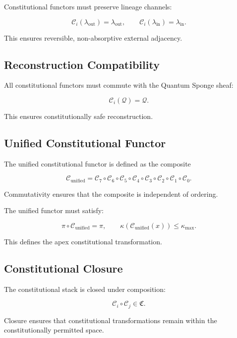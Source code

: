 Constitutional functors must preserve lineage channels:

\[
\mathcal{C}_i(\lambda_{\mathrm{out}}) = \lambda_{\mathrm{out}}, \qquad
\mathcal{C}_i(\lambda_{\mathrm{in}})  = \lambda_{\mathrm{in}}.
\]

This ensures reversible, non-absorptive external adjacency.


\subsection{Reconstruction Compatibility}

All constitutional functors must commute with the Quantum Sponge sheaf:

\[
\mathcal{C}_i(\mathcal{Q}) = \mathcal{Q}.
\]

This ensures constitutionally safe reconstruction.


\subsection{Unified Constitutional Functor}

The unified constitutional functor is defined as the composite

\[
\mathcal{C}_{\mathrm{unified}}
=
\mathcal{C}_7 \circ \mathcal{C}_6 \circ \mathcal{C}_5 \circ
\mathcal{C}_4 \circ \mathcal{C}_3 \circ \mathcal{C}_2 \circ
\mathcal{C}_1 \circ \mathcal{C}_0.
\]

Commutativity ensures that the composite is independent of ordering.

The unified functor must satisfy:

\[
\pi \circ \mathcal{C}_{\mathrm{unified}} = \pi,
\qquad
\kappa(\mathcal{C}_{\mathrm{unified}}(x)) \le \kappa_{\max}.
\]

This defines the apex constitutional transformation.


\subsection{Constitutional Closure}

The constitutional stack is closed under composition:

\[
\mathcal{C}_i \circ \mathcal{C}_j \in \mathfrak{C}.
\]

Closure ensures that constitutional transformations remain within the
constitutionally permitted space.

